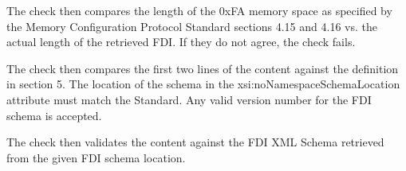 The check then compares the length of the 0xFA memory space 
as specified by the Memory Configuration Protocol Standard sections 4.15 and 4.16
vs. the actual length of the retrieved FDI.
If they do not agree, the check fails.

The check then compares the first two lines of the content against the 
definition in section 5. 
The location of the schema in the xsi:noNamespaceSchemaLocation attribute 
must match the Standard.
Any valid version number for the FDI schema is accepted.

The check then validates the content against the FDI XML Schema
retrieved from the given FDI schema location.

  
